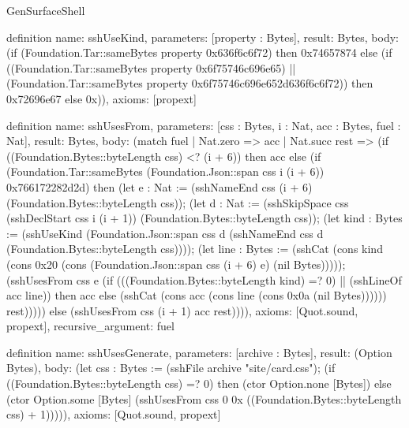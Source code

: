 \begin{lexlean}{GenSurfaceShell}
\begin{semanticmodule}
definition{
  name: sshUseKind,
  parameters: [property : Bytes],
  result: Bytes,
  body: (if (Foundation.Tar::sameBytes property 0x636f6c6f72) then 0x74657874 else (if ((Foundation.Tar::sameBytes property 0x6f75746c696e65) || (Foundation.Tar::sameBytes property 0x6f75746c696e652d636f6c6f72)) then 0x72696e67 else 0x)),
  axioms: [propext]
}

definition{
  name: sshUsesFrom,
  parameters: [css : Bytes, i : Nat, acc : Bytes, fuel : Nat],
  result: Bytes,
  body: (match fuel
    | Nat.zero => acc
    | Nat.succ rest => (if ((Foundation.Bytes::byteLength css) <? (i + 6)) then acc else (if (Foundation.Tar::sameBytes (Foundation.Json::span css i (i + 6)) 0x766172282d2d) then (let e : Nat := (sshNameEnd css (i + 6) (Foundation.Bytes::byteLength css)); (let d : Nat := (sshSkipSpace css (sshDeclStart css i (i + 1)) (Foundation.Bytes::byteLength css)); (let kind : Bytes := (sshUseKind (Foundation.Json::span css d (sshNameEnd css d (Foundation.Bytes::byteLength css)))); (let line : Bytes := (sshCat (cons kind (cons 0x20 (cons (Foundation.Json::span css (i + 6) e) (nil Bytes))))); (sshUsesFrom css e (if (((Foundation.Bytes::byteLength kind) =? 0) || (sshLineOf acc line)) then acc else (sshCat (cons acc (cons line (cons 0x0a (nil Bytes)))))) rest))))) else (sshUsesFrom css (i + 1) acc rest)))),
  axioms: [Quot.sound, propext],
  recursive_argument: fuel
}

definition{
  name: sshUsesGenerate,
  parameters: [archive : Bytes],
  result: (Option Bytes),
  body: (let css : Bytes := (sshFile archive "site/card.css"); (if ((Foundation.Bytes::byteLength css) =? 0) then (ctor Option.none [Bytes]) else (ctor Option.some [Bytes] (sshUsesFrom css 0 0x ((Foundation.Bytes::byteLength css) + 1))))),
  axioms: [Quot.sound, propext]
}


\end{semanticmodule}
\end{lexlean}
